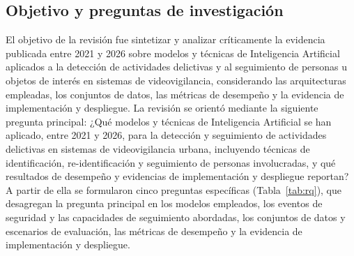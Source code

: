 \documentclass[pdflatex,sn-mathphys-num]{sn-jnl}%
\theoremstyle{thmstyleone}%
\theoremstyle{thmstyletwo}%
\theoremstyle{thmstylethree}%
\begin{document}
\subsection{Objetivo y preguntas de investigación}\label{subsec:preguntas}

El objetivo de la revisión fue sintetizar y analizar críticamente la evidencia publicada entre 2021 y 2026 sobre modelos y técnicas de Inteligencia Artificial aplicados a la detección de actividades delictivas y al seguimiento de personas u objetos de interés en sistemas de videovigilancia, considerando las arquitecturas empleadas, los conjuntos de datos, las métricas de desempeño y la evidencia de implementación y despliegue. La revisión se orientó mediante la siguiente pregunta principal: ¿Qué modelos y técnicas de Inteligencia Artificial se han aplicado, entre 2021 y 2026, para la detección y seguimiento de actividades delictivas en sistemas de videovigilancia urbana, incluyendo técnicas de identificación, re-identificación y seguimiento de personas involucradas, y qué resultados de desempeño y evidencias de implementación y despliegue reportan? A partir de ella se formularon cinco preguntas específicas (Tabla~\ref{tab:rq}), que desagregan la pregunta principal en los modelos empleados, los eventos de seguridad y las capacidades de seguimiento abordadas, los conjuntos de datos y escenarios de evaluación, las métricas de desempeño y la evidencia de implementación y despliegue.
\end{document}
